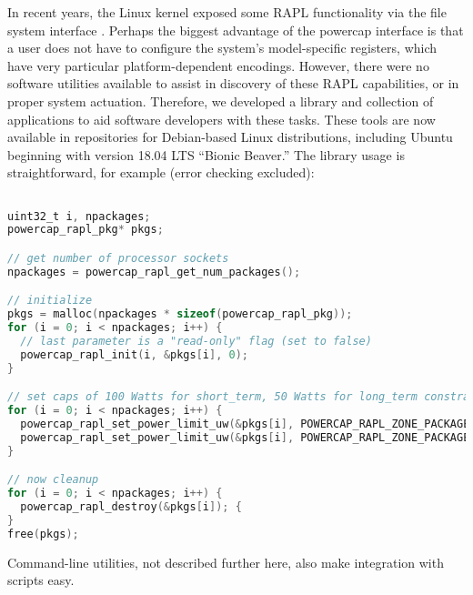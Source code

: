 In recent years, the Linux kernel exposed some RAPL functionality via the  file system interface \cite{powercap}.
Perhaps the biggest advantage of the powercap interface is that a user does not have to configure the system's model-specific registers, which have very particular platform-dependent encodings.
However, there were no software utilities available to assist in discovery of these RAPL capabilities, or in proper system actuation.
Therefore, we developed a  library and collection of applications to aid software developers with these tasks.
These tools are now available in repositories for Debian-based Linux distributions, including Ubuntu beginning with version 18.04 LTS ``Bionic Beaver.''
The library usage is straightforward, for example (error checking excluded):
%
\begin{lstlisting}[language=C,%
  caption={Setting RAPL power caps with the powercap library.},%
  morekeywords={uint32_t},%
  label={lst:powercap-example}]%

uint32_t i, npackages;
powercap_rapl_pkg* pkgs;

// get number of processor sockets
npackages = powercap_rapl_get_num_packages();

// initialize
pkgs = malloc(npackages * sizeof(powercap_rapl_pkg));
for (i = 0; i < npackages; i++) {
  // last parameter is a "read-only" flag (set to false)
  powercap_rapl_init(i, &pkgs[i], 0);
}

// set caps of 100 Watts for short_term, 50 Watts for long_term constraints on each package
for (i = 0; i < npackages; i++) {
  powercap_rapl_set_power_limit_uw(&pkgs[i], POWERCAP_RAPL_ZONE_PACKAGE, POWERCAP_RAPL_CONSTRAINT_SHORT, 100 * 1000000);
  powercap_rapl_set_power_limit_uw(&pkgs[i], POWERCAP_RAPL_ZONE_PACKAGE, POWERCAP_RAPL_CONSTRAINT_LONG, 50 * 1000000);
}

// now cleanup
for (i = 0; i < npackages; i++) {
  powercap_rapl_destroy(&pkgs[i]); {
}
free(pkgs);
\end{lstlisting}
Command-line utilities, not described further here, also make integration with scripts easy.

